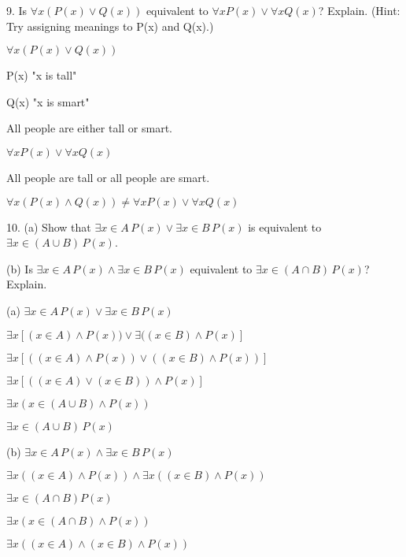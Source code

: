 \documentclass{article}
\begin{document}
\vspace{30pt}

9. Is $\forall x (P(x) \lor Q(x))$ equivalent to $\forall x P(x) \lor \forall x Q(x)$?
Explain. (Hint: Try assigning meanings to P(x) and Q(x).)
\vspace{30pt}

$\forall x (P(x) \lor Q(x))$

P(x) "x is tall"

Q(x) "x is smart"

All people are either tall or smart.
\vspace{20pt}

$\forall x P(x) \lor \forall x Q(x)$

All people are tall or all people are smart.

$\forall x (P(x) \land Q(x)) \neq \forall x P(x) \lor \forall x Q(x)$

\vspace{30pt}

10. (a) Show that $\exists x \in A \, P(x) \lor \exists x \in B \, P(x)$ is equivalent to $\exists x \in (A \cup B) \, P(x)$.

\hspace{12pt}(b) Is $\exists x \in A \, P(x) \land \exists x \in B \, P(x)$ equivalent to $\exists x \in (A \cap B) \, P(x)$?
Explain.
\vspace{30pt}

(a) $\exists x \in A \, P(x) \lor \exists x \in B \, P(x)$

$\exists x [(x \in A) \land P(x)) \lor \exists ((x \in B) \land P(x)]$

$\exists x [((x \in A) \land P(x)) \lor ((x \in B) \land P(x))]$

$\exists x [((x \in A) \lor (x \in B)) \land P(x)]$

$\exists x (x \in (A \cup B) \land P(x))$

$\exists x \in (A \cup B) \, P(x)$

\vspace{20pt}

(b) $\exists x \in A \, P(x) \land \exists x \in B \, P(x)$

$\exists x ((x \in A) \land P(x)) \land \exists x ((x \in B) \land P(x))$
\vspace{20pt}

$\exists x \in (A \cap B) P(x)$

$\exists x (x \in (A \cap B) \land P(x))$

$\exists x ((x \in A) \land (x \in B) \land P(x))$
\vspace{20pt}
\end{document}
